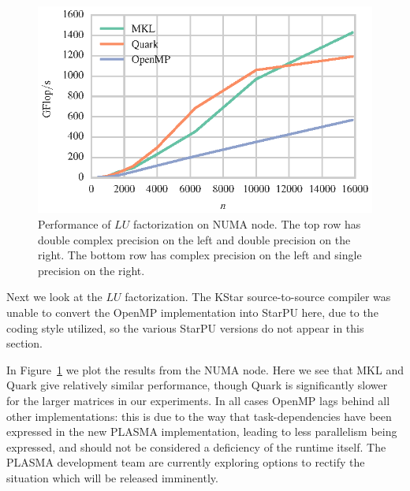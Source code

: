\documentclass[a4paper,12pt]{article}
\begin{document}
\begin{figure}[t]
  \includegraphics[scale=.85]{fig/kebnekaise_sgetrf_weak_scaling.eps}
  \caption{Performance of $LU$ factorization on NUMA node.
    The top row has double complex precision on the left and double
    precision on the right.
    The bottom row has complex precision on the left and single
    precision on the right.}
  \label{fig.lu_numa}
\end{figure}

Next we look at the $LU$ factorization.
The KStar source-to-source compiler was unable to convert
the OpenMP implementation into StarPU here,
due to the coding style utilized,
so the various StarPU versions do not appear in this section.

In Figure~\ref{fig.lu_numa} we plot the results from the NUMA node.
Here we see that MKL and Quark give
relatively similar performance,
though Quark is significantly slower for the larger matrices in our
experiments.
In all cases OpenMP lags behind all other implementations:
this is due to the way that task-dependencies have been expressed
in the new PLASMA implementation,
leading to less parallelism being expressed,
and should not be considered a deficiency of the runtime itself.
The PLASMA development team are currently exploring options
to rectify the situation which will be released imminently.
\end{document}
